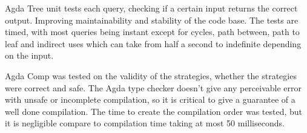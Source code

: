 Agda Tree unit tests each query, checking if a certain input returns the
correct output. Improving maintainability and stability of the code base. The
tests are timed, with most queries being instant except for cycles, path
between, path to leaf and indirect uses which can take from half a second to
indefinite depending on the input.  

Agda Comp was tested on the validity of the strategies, whether the strategies
were correct and safe. The Agda type checker doesn't give any perceivable error
with unsafe or incomplete compilation, so it is critical to give a guarantee of
a well done compilation. The time to create the compilation order was tested,
but it is negligible compare to compilation time taking at most 50
milliseconds.

%

